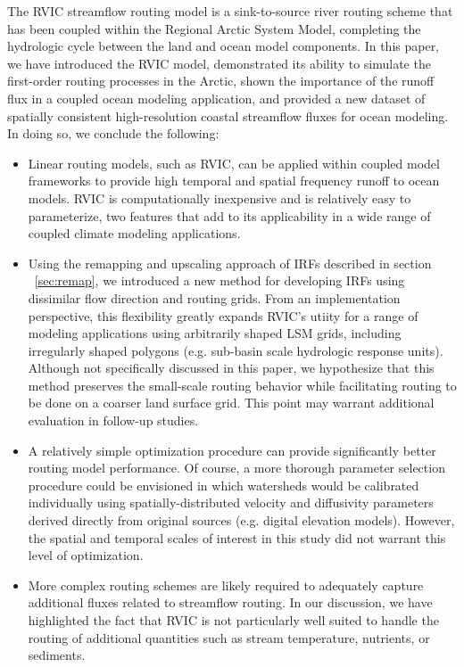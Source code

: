 \documentclass[jgrga, draft]{agutex}
\begin{document}
\begin{article}
The RVIC streamflow routing model is a sink-to-source river routing scheme that has been coupled within the Regional Arctic System Model, completing the hydrologic cycle between the land and ocean model components.
In this paper, we have introduced the RVIC model, demonstrated its ability to simulate the first-order routing processes in the Arctic, shown the  importance of the runoff flux in a coupled ocean modeling application, and provided a new dataset of spatially consistent high-resolution coastal streamflow fluxes for ocean modeling.
In doing so, we conclude the following:

\begin{itemize}[leftmargin=+.5in]
  \item Linear routing models, such as RVIC, can be applied within coupled model frameworks to provide high temporal and spatial frequency runoff to ocean models.
  RVIC is computationally inexpensive and is relatively easy to parameterize, two features that add to its applicability in a wide range of coupled climate modeling applications.
  \item Using the remapping and upscaling approach of IRFs described in section ~\ref{sec:remap}, we introduced a new method for developing IRFs using dissimilar flow direction and routing grids.
  From an implementation perspective, this flexibility greatly expands RVIC's utiity for a range of modeling applications using arbitrarily shaped LSM grids, including irregularly shaped polygons (e.g. sub-basin scale hydrologic response units).
  Although not specifically discussed in this paper, we hypothesize that this method preserves the small-scale routing behavior while facilitating routing to be done on a coarser land surface grid.
  This point may warrant additional evaluation in follow-up studies.
  \item A relatively simple optimization procedure can provide significantly better routing model performance.
  Of course, a more thorough parameter selection procedure could be envisioned in which watersheds would be calibrated individually using spatially-distributed velocity and diffusivity parameters derived directly from original sources (e.g. digital elevation models).
  However, the spatial and temporal scales of interest in this study did not warrant this level of optimization.
  \item More complex routing schemes are likely required to adequately capture additional fluxes related to streamflow routing.
  In our discussion, we have highlighted the fact that RVIC is not particularly well suited to handle the routing of additional quantities such as stream temperature, nutrients, or sediments.

\end{itemize}
\end{article}
\end{document}
